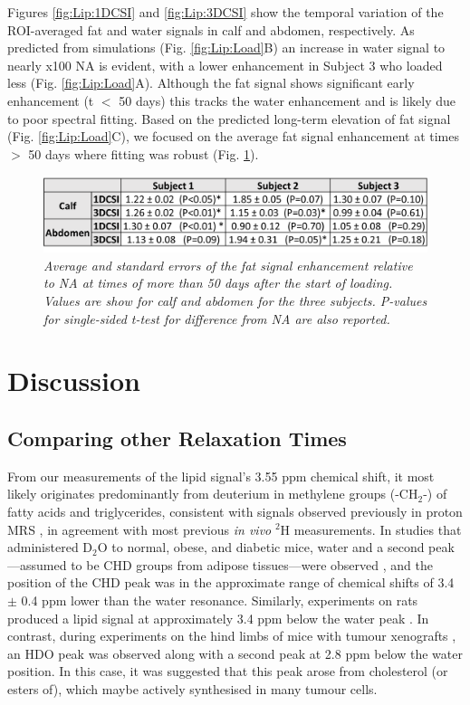 Figures \ref{fig:Lip:1DCSI} and \ref{fig:Lip:3DCSI} show the temporal variation of the \ac{ROI}-averaged fat and water signals in calf and abdomen, respectively. As predicted from simulations (Fig. \ref{fig:Lip:Load}B) an increase in water signal to nearly x100 \ac{NA} is evident, with a lower enhancement in Subject 3 who loaded less (Fig. \ref{fig:Lip:Load}A). Although the fat signal shows significant early enhancement (t $<$ 50 days) this tracks the water enhancement and is likely due to poor spectral fitting. Based on the predicted long-term elevation of fat signal (Fig. \ref{fig:Lip:Load}C), we focused on the average fat signal enhancement at times $>$ 50 days where fitting was robust (Fig. \ref{fig:Lip:Amp_Table}). 

\begin{figure}
    \centering
    \includegraphics[width=1\textwidth]{Figures/Lipid/Lipid_Table.png}
    \caption{\textit{Average and standard errors of the fat signal enhancement relative to \ac{NA} at times of more than 50 days after the start of loading. Values are show for calf and abdomen for the three subjects. P-values for single-sided t-test for difference from \ac{NA} are also reported.}}
    \label{fig:Lip:Amp_Table}
\end{figure}

\section{Discussion}

\subsection{Comparing other Relaxation Times}

From our measurements of the lipid signal’s 3.55 ppm chemical shift, it most likely originates predominantly from deuterium in methylene groups (-CH$_2$-) of fatty acids and triglycerides, consistent with signals observed previously in proton \ac{MRS} \cite{Ren2008CompositionTesla}, in agreement with most previous \textit{in vivo} $^2$H measurements. In studies that administered D$_2$O to normal, obese, and diabetic mice, water and a second peak—assumed to be CHD groups from adipose tissues—were observed \cite{Brereton1986PreliminarySpectroscopy, Brereton1989TheMice}, and the position of the CHD peak was in the approximate range of chemical shifts of 3.4 $\pm$ 0.4 ppm lower than the water resonance. Similarly, experiments on rats produced a lipid signal at approximately 3.4 ppm below the water peak \cite{Kosenkov2018TheMice}. In contrast, during experiments on the hind limbs of mice with tumour xenografts \cite{Assmann2020InCholesterol}, an \ac{HDO} peak was observed along with a second peak at 2.8 ppm below the water position. In this case, it was suggested \cite{Assmann2020InCholesterol} that this peak arose from cholesterol (or esters of), which maybe actively synthesised in many tumour cells.

